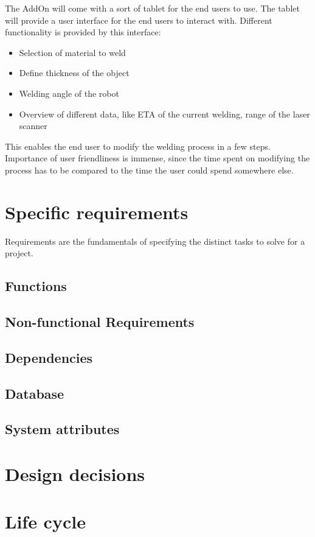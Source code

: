 \documentclass[12pt]{report} %
\begin{document}
The AddOn will come with a sort of tablet for the end users to use. The tablet will provide a user interface for the end users to interact with. Different functionality is provided by this interface: 

\begin{itemize}

\item Selection of material to weld 
\item Define thickness of the object
\item Welding angle of the robot
\item Overview of different data, like ETA of the current welding, range of the laser scanner

\end{itemize}

This enables the end user to modify the welding process in a few steps. Importance of user friendliness is immense, since the time spent on modifying the process has to be compared to the time the user could spend somewhere else.

\section{Specific requirements}
Requirements are the fundamentals of specifying the distinct tasks to solve for a project. 

\subsection{Functions}

\subsection{Non-functional Requirements}

\subsection{Dependencies}

\subsection{Database}

\subsection{System attributes}

\section{Design decisions}

\section{Life cycle}
\end{document}

